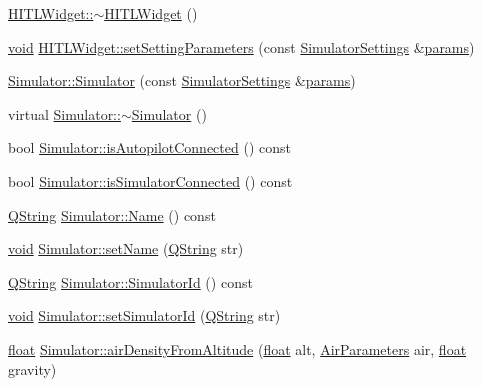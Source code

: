 \begin{DoxyCompactItemize}
\item 
\hyperlink{group___h_i_t_l_plugin_gad53ecce8b7088bb11049d62819ff96f4}{H\-I\-T\-L\-Widget\-::$\sim$\-H\-I\-T\-L\-Widget} ()
\item 
\hyperlink{group___u_a_v_objects_plugin_ga444cf2ff3f0ecbe028adce838d373f5c}{void} \hyperlink{group___h_i_t_l_plugin_ga31d53f47fdb03b2ef1c879fa4e55ba53}{H\-I\-T\-L\-Widget\-::set\-Setting\-Parameters} (const \hyperlink{group___h_i_t_l_plugin_ga052199f1328d3002bce3e45345aa7f4e}{Simulator\-Settings} \&\hyperlink{glext_8h_afeb6390ab3bc8a0e96a88aff34d52288}{params})
\item 
\hyperlink{group___h_i_t_l_plugin_ga8599e13b1f45081a08b7dd1f8c2a988b}{Simulator\-::\-Simulator} (const \hyperlink{group___h_i_t_l_plugin_ga052199f1328d3002bce3e45345aa7f4e}{Simulator\-Settings} \&\hyperlink{glext_8h_afeb6390ab3bc8a0e96a88aff34d52288}{params})
\item 
virtual \hyperlink{group___h_i_t_l_plugin_ga0f49aa04f42060a785adf77346b9de9f}{Simulator\-::$\sim$\-Simulator} ()
\item 
bool \hyperlink{group___h_i_t_l_plugin_gae38ae2b9870e2eb3888b406ef069b0ac}{Simulator\-::is\-Autopilot\-Connected} () const 
\item 
bool \hyperlink{group___h_i_t_l_plugin_ga4736ea66352f66d9977879364f3c3c0a}{Simulator\-::is\-Simulator\-Connected} () const 
\item 
\hyperlink{group___u_a_v_objects_plugin_gab9d252f49c333c94a72f97ce3105a32d}{Q\-String} \hyperlink{group___h_i_t_l_plugin_ga40c6b40efb10e456ccedfdcd88d5988d}{Simulator\-::\-Name} () const 
\item 
\hyperlink{group___u_a_v_objects_plugin_ga444cf2ff3f0ecbe028adce838d373f5c}{void} \hyperlink{group___h_i_t_l_plugin_ga11bc3ca9ef98431bcb82d8b72ad127b8}{Simulator\-::set\-Name} (\hyperlink{group___u_a_v_objects_plugin_gab9d252f49c333c94a72f97ce3105a32d}{Q\-String} str)
\item 
\hyperlink{group___u_a_v_objects_plugin_gab9d252f49c333c94a72f97ce3105a32d}{Q\-String} \hyperlink{group___h_i_t_l_plugin_gac518ebc236c9f36b629c1145408315aa}{Simulator\-::\-Simulator\-Id} () const 
\item 
\hyperlink{group___u_a_v_objects_plugin_ga444cf2ff3f0ecbe028adce838d373f5c}{void} \hyperlink{group___h_i_t_l_plugin_ga7c1b69b9900d1cb7e5b849f98adf0f9c}{Simulator\-::set\-Simulator\-Id} (\hyperlink{group___u_a_v_objects_plugin_gab9d252f49c333c94a72f97ce3105a32d}{Q\-String} str)
\item 
\hyperlink{_super_l_u_support_8h_a6a1bb6ed41f44b60e7bd83b0e9945aa7}{float} \hyperlink{group___h_i_t_l_plugin_ga20d3be9c0283514b5e2ca35280a86665}{Simulator\-::air\-Density\-From\-Altitude} (\hyperlink{_super_l_u_support_8h_a6a1bb6ed41f44b60e7bd83b0e9945aa7}{float} alt, \hyperlink{struct_air_parameters}{Air\-Parameters} air, \hyperlink{_super_l_u_support_8h_a6a1bb6ed41f44b60e7bd83b0e9945aa7}{float} gravity)

\end{DoxyCompactItemize}
